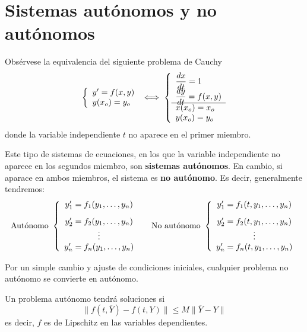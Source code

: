 \section{Sistemas autónomos y no autónomos}
Obsérvese la equivalencia del siguiente problema de Cauchy
$$\left\{\begin{array}{l}
     y'=f(x,y)  \\
     y(x_o)=y_o 
\end{array} \right. \iff \left\{\begin{array}{l}
     \dfrac{dx}{dt}=1  \\
     \vspace{-5mm} \\
     \dfrac{dy}{dt}=f(x,y) \\
     \vspace{-5mm} \\
     \hline x(x_o)=x_o \\
     y(x_o)=y_o
\end{array} \right.$$ donde la variable independiente $t$ no aparece en el primer miembro.
\begin{defi}
    Este tipo de sistemas de ecuaciones, en los que la variable independiente no aparece en los segundos miembro, son \textbf{sistemas autónomos}. En cambio, si aparace en ambos miembros, el sistema es \textbf{no autónomo}. Es decir, generalmente tendremos:
    $$\text{Autónomo } \left\{ \begin{array}{c}
        \vspace{3mm} y'_1=f_1(y_1, \ldots, y_n)  \\
   y'_2=f_2(y_1, \ldots, y_n) \\
     \vdots \\
     y'_n=f_n(y_1, \ldots, y_n) 
\end{array} \right. \quad 
\text{ No autónomo } \left\{ \begin{array}{c}
        \vspace{3mm} y'_1=f_1(t,y_1, \ldots, y_n)  \\
   y'_2=f_2(t,y_1, \ldots, y_n) \\
     \vdots \\
     y'_n=f_n(t,y_1, \ldots, y_n) 
\end{array} \right.$$
\end{defi}
\begin{cor}
    Por un simple cambio y ajuste de condiciones iniciales, cualquier problema no autónomo se convierte en autónomo.
\end{cor}
\begin{prop}
    Un problema autónomo tendrá soluciones si
    $$\|f(t,\overline{Y})-f(t,Y)\|\leq M\|\overline{Y}-Y\|$$
    es decir, $f$ es de Lipschitz en las variables dependientes.
\end{prop}
